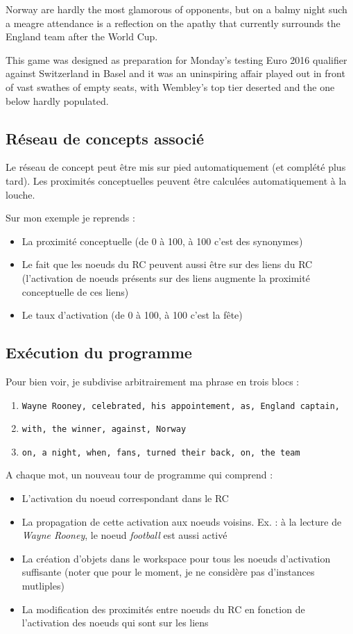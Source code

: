 \documentclass{article}           %
\begin{document}
Norway are hardly the most glamorous of opponents, but on a balmy night such a meagre attendance is a reflection on the apathy that currently surrounds the England team after the World Cup.

This game was designed as preparation for Monday's testing Euro 2016 qualifier against Switzerland in Basel and it was an uninspiring affair played out in front of vast swathes of empty seats, with Wembley's top tier deserted and the one below hardly populated.

\subsection{Réseau de concepts associé}

Le réseau de concept peut être mis sur pied automatiquement (et complété plus tard).
Les proximités conceptuelles peuvent être calculées automatiquement à la louche.

Sur mon exemple je reprends :
\begin{itemize}
 \item La proximité conceptuelle (de 0 à 100, à 100 c'est des synonymes)
 \item Le fait que les noeuds du RC peuvent aussi être sur des liens du RC (l'activation de noeuds présents sur des liens augmente la proximité conceptuelle de ces liens)
 \item Le taux d'activation (de 0 à 100, à 100 c'est la fête)
\end{itemize}


\subsection{Exécution du programme}

Pour bien voir, je subdivise arbitrairement ma phrase en trois blocs :
\begin{enumerate}
  \item \verb|Wayne Rooney, celebrated, his appointement, as, England captain, |
  \item \verb|with, the winner, against, Norway |
  \item \verb|on, a night, when, fans, turned their back, on, the team|
\end{enumerate}

 A chaque mot, un nouveau tour de programme qui comprend :
 \begin{itemize}
  \item L'activation du noeud correspondant dans le RC
  \item La propagation de cette activation aux noeuds voisins. Ex. : à la lecture de \textit{Wayne Rooney}, le noeud \textit{football} est aussi activé
  \item La création d'objets dans le workspace pour tous les noeuds d'activation suffisante (noter que pour le moment, je ne considère pas d'instances mutliples)
  \item La modification des proximités entre noeuds du RC en fonction de l'activation des noeuds qui sont sur les liens
 \end{itemize}
 
\end{document}
